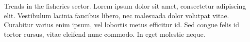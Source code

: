 Trends in the fisheries sector. Lorem ipsum dolor sit amet, consectetur adipiscing elit. Vestibulum lacinia faucibus libero, nec malesuada dolor volutpat vitae. Curabitur varius enim ipsum, vel lobortis metus efficitur id. Sed congue felis id tortor cursus, vitae eleifend nunc commodo. In eget molestie neque.
